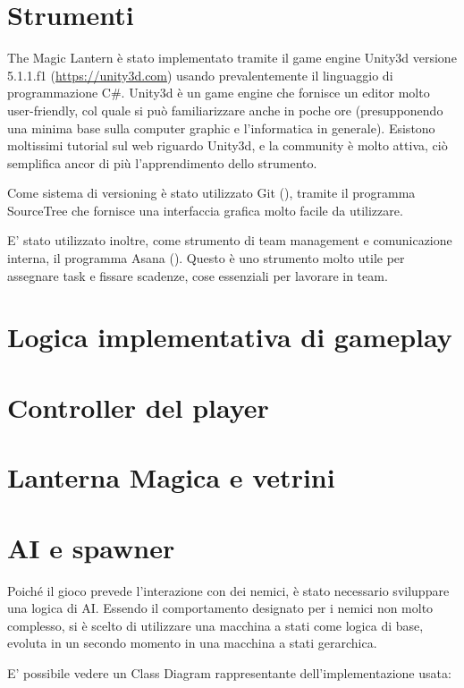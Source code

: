 \section{Strumenti}

The Magic Lantern è stato implementato tramite il game engine Unity3d versione 5.1.1.f1 (\url{https://unity3d.com}) usando prevalentemente il linguaggio di programmazione C\#. Unity3d è un game engine che fornisce un editor molto user-friendly, col quale si può familiarizzare anche in poche ore (presupponendo una minima base sulla computer graphic e l'informatica in generale). Esistono moltissimi tutorial sul web riguardo Unity3d, e la community è molto attiva, ciò semplifica ancor di più l'apprendimento dello strumento.

Come sistema di versioning è stato utilizzato Git (\cite{github}), tramite il programma SourceTree che fornisce una interfaccia grafica molto facile da utilizzare.

E' stato utilizzato inoltre, come strumento di team management e comunicazione interna, il programma Asana (\cite{asana}). Questo è uno strumento molto utile per assegnare task e fissare scadenze, cose essenziali per lavorare in team.


\section{Logica implementativa di gameplay}

\section{Controller del player}

\section{Lanterna Magica e vetrini}


\section{AI e spawner}

Poiché il gioco prevede l'interazione con dei nemici, è stato necessario sviluppare una logica di AI. Essendo il comportamento designato per i nemici non molto complesso, si è scelto di utilizzare una macchina a stati come logica di base, evoluta in un secondo momento in una macchina a stati gerarchica.

E' possibile vedere un Class Diagram rappresentante dell'implementazione usata:

